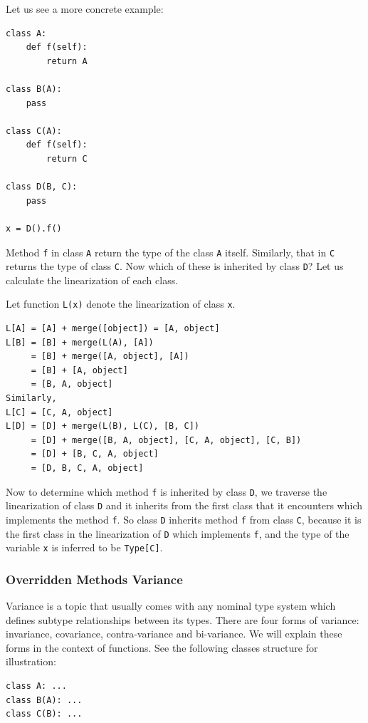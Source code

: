 Let us see a more concrete example:

\begin{lstlisting}
class A:
	def f(self):
		return A

class B(A):
	pass

class C(A):
	def f(self):
		return C
		
class D(B, C):
	pass
	
x = D().f()
\end{lstlisting}

Method \lstinline|f| in class \lstinline|A| return the type of the class \lstinline|A| itself. Similarly, that in \lstinline|C| returns the type of class \lstinline|C|. Now which of these is inherited by class \lstinline|D|? Let us calculate the linearization of each class.

Let function \lstinline|L(x)| denote the linearization of class \lstinline|x|.
\begin{lstlisting}
L[A] = [A] + merge([object]) = [A, object]
L[B] = [B] + merge(L(A), [A])
     = [B] + merge([A, object], [A])
     = [B] + [A, object]
     = [B, A, object]
Similarly,
L[C] = [C, A, object]
L[D] = [D] + merge(L(B), L(C), [B, C])
     = [D] + merge([B, A, object], [C, A, object], [C, B])
     = [D] + [B, C, A, object]
     = [D, B, C, A, object]
\end{lstlisting}

Now to determine which method \lstinline|f| is inherited by class \lstinline|D|, we traverse the linearization of class \lstinline|D| and it inherits from the first class that it encounters which implements the method \lstinline|f|. So class \lstinline|D| inherits method \lstinline|f| from class \lstinline|C|, because it is the first class in the linearization of \lstinline|D| which implements \lstinline|f|, and the type of the variable \lstinline|x| is inferred to be \lstinline|Type[C]|.

\subsubsection{Overridden Methods Variance}
Variance is a topic that usually comes with any nominal type system which defines subtype relationships between its types. There are four forms of variance: invariance, covariance, contra-variance and bi-variance. We will explain these forms in the context of functions. See the following classes structure for illustration:
\begin{lstlisting}
class A: ...
class B(A): ...
class C(B): ...
\end{lstlisting}

